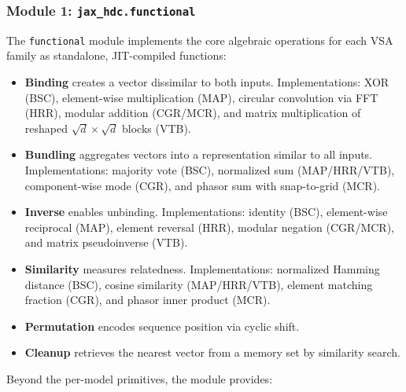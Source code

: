 \documentclass[twoside,11pt]{article}
\begin{document}
\subsubsection{Module 1: \texttt{jax\_hdc.functional}}

The \texttt{functional} module implements the core algebraic operations for each VSA family as standalone, JIT-compiled functions:

\begin{itemize}
\item \textbf{Binding} creates a vector dissimilar to both inputs. Implementations: XOR (BSC), element-wise multiplication (MAP), circular convolution via FFT (HRR), modular addition (CGR/MCR), and matrix multiplication of reshaped $\sqrt{d} \times \sqrt{d}$ blocks (VTB).
\item \textbf{Bundling} aggregates vectors into a representation similar to all inputs. Implementations: majority vote (BSC), normalized sum (MAP/HRR/VTB), component-wise mode (CGR), and phasor sum with snap-to-grid (MCR).
\item \textbf{Inverse} enables unbinding. Implementations: identity (BSC), element-wise reciprocal (MAP), element reversal (HRR), modular negation (CGR/MCR), and matrix pseudoinverse (VTB).
\item \textbf{Similarity} measures relatedness. Implementations: normalized Hamming distance (BSC), cosine similarity (MAP/HRR/VTB), element matching fraction (CGR), and phasor inner product (MCR).
\item \textbf{Permutation} encodes sequence position via cyclic shift.
\item \textbf{Cleanup} retrieves the nearest vector from a memory set by similarity search.
\end{itemize}

Beyond the per-model primitives, the module provides:
\end{document}
